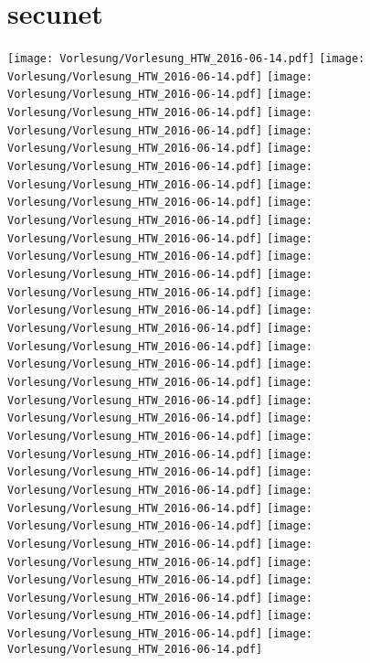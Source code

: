 \documentclass{scrreprt}
\begin{document}
\chapter{secunet}
\newcommand{\secuScale}{.25}
\begin{center}
\texttt{[image: Vorlesung/Vorlesung\_HTW\_2016-06-14.pdf]}
\texttt{[image: Vorlesung/Vorlesung\_HTW\_2016-06-14.pdf]}
\texttt{[image: Vorlesung/Vorlesung\_HTW\_2016-06-14.pdf]}
\texttt{[image: Vorlesung/Vorlesung\_HTW\_2016-06-14.pdf]}
\texttt{[image: Vorlesung/Vorlesung\_HTW\_2016-06-14.pdf]}
\texttt{[image: Vorlesung/Vorlesung\_HTW\_2016-06-14.pdf]}
\texttt{[image: Vorlesung/Vorlesung\_HTW\_2016-06-14.pdf]}
\texttt{[image: Vorlesung/Vorlesung\_HTW\_2016-06-14.pdf]}
\texttt{[image: Vorlesung/Vorlesung\_HTW\_2016-06-14.pdf]}
\texttt{[image: Vorlesung/Vorlesung\_HTW\_2016-06-14.pdf]}
\texttt{[image: Vorlesung/Vorlesung\_HTW\_2016-06-14.pdf]}
\texttt{[image: Vorlesung/Vorlesung\_HTW\_2016-06-14.pdf]}
\texttt{[image: Vorlesung/Vorlesung\_HTW\_2016-06-14.pdf]}
\texttt{[image: Vorlesung/Vorlesung\_HTW\_2016-06-14.pdf]}
\texttt{[image: Vorlesung/Vorlesung\_HTW\_2016-06-14.pdf]}
\texttt{[image: Vorlesung/Vorlesung\_HTW\_2016-06-14.pdf]}
\texttt{[image: Vorlesung/Vorlesung\_HTW\_2016-06-14.pdf]}
\texttt{[image: Vorlesung/Vorlesung\_HTW\_2016-06-14.pdf]}
\texttt{[image: Vorlesung/Vorlesung\_HTW\_2016-06-14.pdf]}
\texttt{[image: Vorlesung/Vorlesung\_HTW\_2016-06-14.pdf]}
\texttt{[image: Vorlesung/Vorlesung\_HTW\_2016-06-14.pdf]}
\texttt{[image: Vorlesung/Vorlesung\_HTW\_2016-06-14.pdf]}
\texttt{[image: Vorlesung/Vorlesung\_HTW\_2016-06-14.pdf]}
\texttt{[image: Vorlesung/Vorlesung\_HTW\_2016-06-14.pdf]}
\texttt{[image: Vorlesung/Vorlesung\_HTW\_2016-06-14.pdf]}
\texttt{[image: Vorlesung/Vorlesung\_HTW\_2016-06-14.pdf]}
\texttt{[image: Vorlesung/Vorlesung\_HTW\_2016-06-14.pdf]}
\texttt{[image: Vorlesung/Vorlesung\_HTW\_2016-06-14.pdf]}
\texttt{[image: Vorlesung/Vorlesung\_HTW\_2016-06-14.pdf]}
\texttt{[image: Vorlesung/Vorlesung\_HTW\_2016-06-14.pdf]}
\texttt{[image: Vorlesung/Vorlesung\_HTW\_2016-06-14.pdf]}
\texttt{[image: Vorlesung/Vorlesung\_HTW\_2016-06-14.pdf]}
\texttt{[image: Vorlesung/Vorlesung\_HTW\_2016-06-14.pdf]}
\texttt{[image: Vorlesung/Vorlesung\_HTW\_2016-06-14.pdf]}
\end{center}

\end{document}
